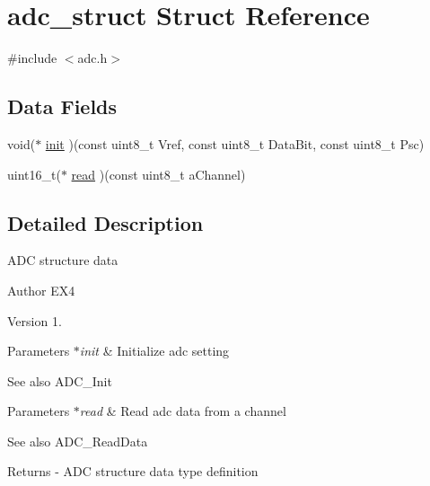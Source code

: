 \hypertarget{structadc__struct}{\section{adc\-\_\-struct Struct Reference}
\label{structadc__struct}
}


{\ttfamily \#include $<$adc.\-h$>$}

\subsection*{Data Fields}
\begin{DoxyCompactItemize}
\item 
void($\ast$ \hyperlink{structadc__struct_a4f53c0113b4dfa7f06084c3bcbe34efa}{init} )(const uint8\-\_\-t Vref, const uint8\-\_\-t Data\-Bit, const uint8\-\_\-t Psc)
\item 
uint16\-\_\-t($\ast$ \hyperlink{structadc__struct_ab1d37058d26e55c8d0e9df1d23e48380}{read} )(const uint8\-\_\-t a\-Channel)
\end{DoxyCompactItemize}


\subsection{Detailed Description}
A\-D\-C structure data \begin{DoxyAuthor}{Author}
E\-X4 
\end{DoxyAuthor}
\begin{DoxyVersion}{Version}
1. 
\end{DoxyVersion}

\begin{DoxyParams}{Parameters}
{\em $\ast$init} & Initialize adc setting \\
\hline
\end{DoxyParams}
\begin{DoxySeeAlso}{See also}
A\-D\-C\-\_\-\-Init 
\end{DoxySeeAlso}

\begin{DoxyParams}{Parameters}
{\em $\ast$read} & Read adc data from a channel \\
\hline
\end{DoxyParams}
\begin{DoxySeeAlso}{See also}
A\-D\-C\-\_\-\-Read\-Data 
\end{DoxySeeAlso}
\begin{DoxyReturn}{Returns}
-\/ A\-D\-C structure data type definition 
\end{DoxyReturn}


